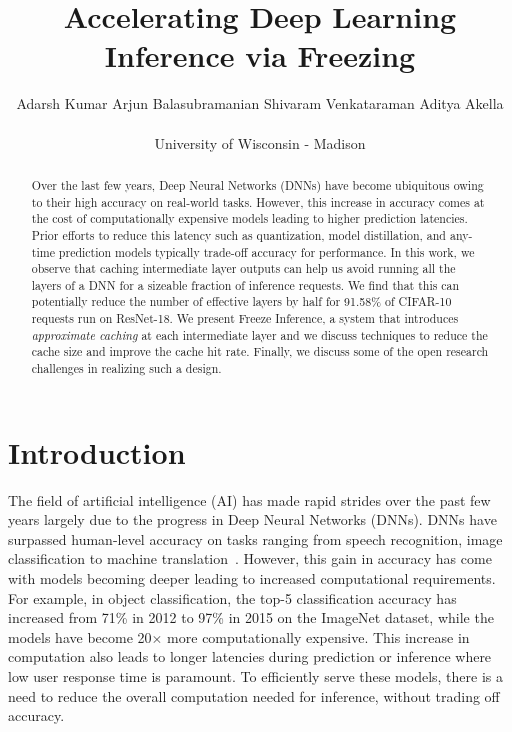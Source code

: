 \documentclass[letterpaper,twocolumn,10pt]{article}
\begin{document}
\date{}

\title{\Large \bf Accelerating Deep Learning Inference via Freezing }

\author{
{\rm Adarsh Kumar \hspace{5mm} \rm Arjun Balasubramanian  \hspace{5mm} \rm Shivaram Venkataraman \hspace{5mm} \rm Aditya Akella}\\ \\
University of Wisconsin - Madison
} \maketitle
\pagestyle{empty}

\begin{abstract}
\label{sec:design}


Over the last few years, Deep Neural Networks (DNNs) have become ubiquitous owing to their high accuracy on real-world tasks. However, this increase in accuracy comes at the cost of computationally expensive models leading to higher prediction latencies. Prior efforts to reduce this latency such as quantization, model distillation, and any-time prediction models typically trade-off accuracy for performance. In this work, we observe that caching intermediate layer outputs can help us avoid running all the layers of a DNN for a sizeable fraction of inference requests. We find that this can potentially reduce the number of effective layers by half for 91.58\% of CIFAR-10 requests run on ResNet-18. We present Freeze Inference, a system that introduces \emph{approximate caching} at each intermediate layer and we discuss techniques to reduce the cache size and improve the cache hit rate. Finally, we discuss some of the open research challenges in realizing such a design.

%
 \end{abstract}


\section{Introduction}
\label{sec:design}
The field of artificial intelligence (AI) has made rapid strides over the past few years largely due to the progress in Deep Neural Networks (DNNs). DNNs have surpassed human-level accuracy on tasks ranging from speech recognition\cite{toward-human-parity-conversational-speech-recognition}, image classification\cite{NIPS2012_4824,DBLP:journals/corr/SimonyanZ14a, DBLP:journals/corr/LinCY13, 43022, DBLP:journals/corr/SzegedyVISW15,Resnet} to machine translation~\cite{hassan2018achieving}. However, this gain in accuracy has come with models becoming deeper leading to increased computational requirements. For example, in object classification, the top-5 classification accuracy has increased from 71\% in 2012 to 97\% in 2015 on the ImageNet dataset, while the models have become 20$\times$ more computationally expensive. This increase in computation also leads to longer latencies during prediction or inference where low user response time is paramount. To efficiently serve these models, there is a need to reduce the overall computation needed for inference, without trading off accuracy.
 
\end{document}
